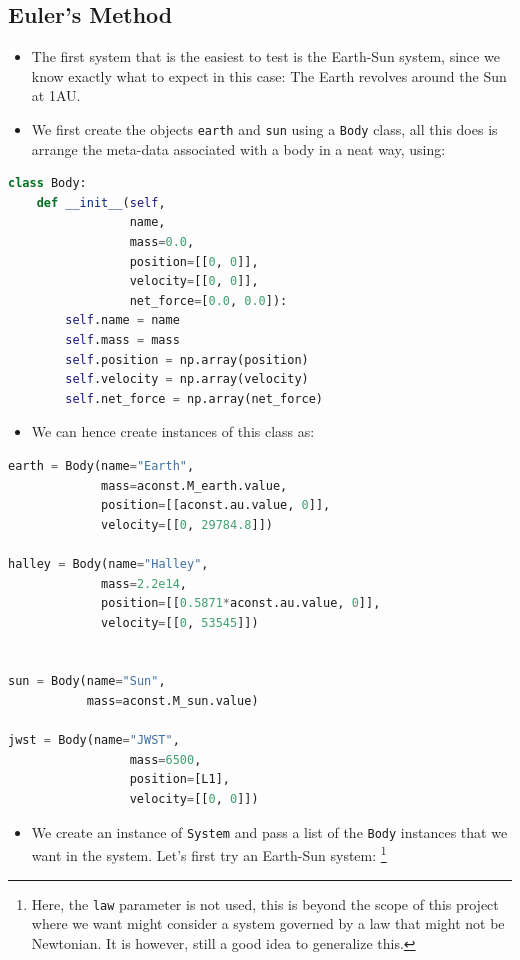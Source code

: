 \documentclass[11pt]{article}
\newcommand{\psubsubsection}[1]{{\subsection*{#1}}}
\begin{document}
    \psubsubsection{Euler's Method}

    \begin{itemize}
        \item The first system that is the easiest to test is the Earth-Sun system, since we know exactly what to expect in this case: The Earth revolves around the Sun at 1AU.
        \item We first create the objects \texttt{earth} and \texttt{sun} using a \texttt{Body} class, all this does is arrange the meta-data associated with a body in a neat way, using:
    \end{itemize}
    \begin{lstlisting}[language=Python, caption=\texttt{Body} class]
class Body:
    def __init__(self,
                 name,
                 mass=0.0,
                 position=[[0, 0]],
                 velocity=[[0, 0]],
                 net_force=[0.0, 0.0]):
        self.name = name
        self.mass = mass
        self.position = np.array(position)
        self.velocity = np.array(velocity)
        self.net_force = np.array(net_force)
    \end{lstlisting}
    \begin{itemize}
        \item We can hence create instances of this class as:
    \end{itemize}
    \begin{lstlisting}[language=Python, caption=\texttt{Body} objects]
earth = Body(name="Earth",
             mass=aconst.M_earth.value,
             position=[[aconst.au.value, 0]],
             velocity=[[0, 29784.8]])

halley = Body(name="Halley",
             mass=2.2e14,
             position=[[0.5871*aconst.au.value, 0]],
             velocity=[[0, 53545]])


sun = Body(name="Sun",
           mass=aconst.M_sun.value)

jwst = Body(name="JWST",
                 mass=6500,
                 position=[L1],
                 velocity=[[0, 0]])
    \end{lstlisting}
    \begin{itemize}
        \item We create an instance of \texttt{System} and pass a list of the \texttt{Body} instances that we want in the system. Let's first try an Earth-Sun system: \footnote{Here, the \texttt{law} parameter is not used, this is beyond the scope of this project where we want might consider a system governed by a law that might not be Newtonian. It is however, still a good idea to generalize this.}
    \end{itemize}
\end{document}
